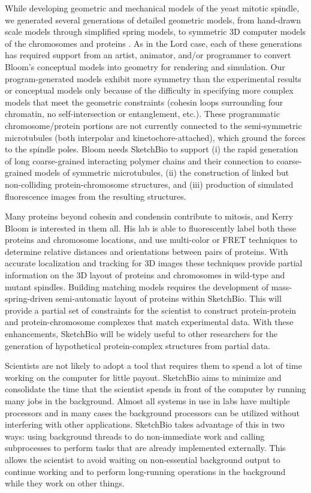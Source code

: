 \documentclass{article} %
\begin{document}
While developing geometric and mechanical models of the yeast mitotic spindle, we generated several generations of detailed geometric models, from hand-drawn scale models through simplified spring models, to symmetric 3D computer models of the chromosomes and proteins \cite{taylorBookChapter}.  As in the Lord case, each of these generations has required support from an artist, animator, and/or programmer to convert Bloom’s conceptual models into geometry for rendering and simulation.  Our program-generated models exhibit more symmetry than the experimental results or conceptual models only because of the difficulty in specifying more complex models that meet the geometric constraints (cohesin loops surrounding four chromatin, no self-intersection or entanglement, etc.).  These programmatic chromosome/protein portions are not currently connected to the semi-symmetric microtubules (both interpolar and kinetochore-attached), which ground the forces to the spindle poles.  Bloom needs SketchBio to support (i) the rapid generation of long coarse-grained interacting polymer chains and their connection to coarse-grained models of symmetric microtubules, (ii) the construction of linked but non-colliding protein-chromosome structures, and (iii) production of simulated fluorescence images from the resulting structures.

Many proteins beyond cohesin and condensin contribute to mitosis, and Kerry Bloom is interested in them all.  His lab is able to fluorescently label both these proteins and chromosome locations, and use multi-color or FRET techniques to determine relative distances and orientations between pairs of proteins.  With accurate localization and tracking for 3D images these techniques provide partial information on the 3D layout of proteins and chromosomes in wild-type and mutant spindles.  Building matching models requires the development of mass-spring-driven semi-automatic layout of proteins within SketchBio.  This will provide a partial set of constraints for the scientist to construct protein-protein and protein-chromosome complexes that match experimental data.  With these enhancements, SketchBio will be widely useful to other researchers for the generation of hypothetical protein-complex structures from partial data.

Scientists are not likely to adopt a tool that requires them to spend a lot of time working on the computer for little payout.  SketchBio aims to minimize and consolidate the time that the scientist spends in front of the computer by running many jobs in the background.  Almost all systems in use in labs have multiple processors and in many cases the background processors can be utilized without interfering with other applications.  SketchBio takes advantage of this in two ways: using background threads to do non-immediate work and calling subprocesses to perform tasks that are already implemented externally.  This allows the scientist to avoid waiting on non-essential background output to continue working and to perform long-running operations in the background while they work on other things.
\end{document}
